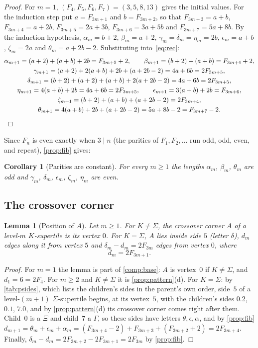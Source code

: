 \documentclass[11pt]{amsart}
\newtheorem{lemma}[theorem]{Lemma}
\newtheorem{corollary}[theorem]{Corollary}
\theoremstyle{definition}
\theoremstyle{remark}
\newcommand{\Fib}{F}
\begin{document}
\begin{proof}
For $m=1$, $(\Fib_4,\Fib_5,\Fib_6,\Fib_7)=(3,5,8,13)$ gives the initial values. For the induction step put
$a=\Fib_{3m+1}$ and $b=\Fib_{3m+2}$, so that $\Fib_{3m+3}=a+b$, $\Fib_{3m+4}=a+2b$, $\Fib_{3m+5}=2a+3b$,
$\Fib_{3m+6}=3a+5b$ and $\Fib_{3m+7}=5a+8b$. By the induction hypothesis, $\alpha_m=b+2$, $\beta_m=a+2$,
$\gamma_m=\delta_m=\eta_m=2b$, $\epsilon_m=a+b$, $\zeta_m=2a$ and $\theta_m=a+2b-2$. Substituting into~\eqref{eq:rec}:
\begin{gather*}
\alpha_{m+1}=(a+2)+(a+b)+2b=\Fib_{3m+5}+2,\qquad \beta_{m+1}=(b+2)+(a+b)=\Fib_{3m+4}+2,\\
\gamma_{m+1}=(a+2)+2(a+b)+2b+(a+2b-2)=4a+6b=2\Fib_{3m+5},\\
\delta_{m+1}=(b+2)+(a+2)+(a+b)+2(a+2b-2)=4a+6b=2\Fib_{3m+5},\\ \eta_{m+1}=4(a+b)+2b=4a+6b=2\Fib_{3m+5},\qquad
\epsilon_{m+1}=3(a+b)+2b=\Fib_{3m+6},\\ \zeta_{m+1}=(b+2)+(a+b)+(a+2b-2)=2\Fib_{3m+4},\\
\theta_{m+1}=4(a+b)+2b+(a+2b-2)=5a+8b-2=\Fib_{3m+7}-2.\qedhere
\end{gather*}
\end{proof}

Since $\Fib_n$ is even exactly when $3\mid n$ (the parities of $\Fib_1,\Fib_2,\dots$ run odd, odd, even, and
repeat), \cref{prop:fib} gives:

\begin{corollary}[Parities are constant]\label{cor:parity}
For every $m\ge1$ the lengths $\alpha_m$, $\beta_m$, $\theta_m$ are odd and $\gamma_m$, $\delta_m$, $\epsilon_m$,
$\zeta_m$, $\eta_m$ are even.
\end{corollary}

\subsection{The crossover corner}
\begin{lemma}[Position of $A$]\label{lem:Apos}
Let $m\ge1$. For $K\neq\Sigma$, the crossover corner $A$ of a level-$m$ $K$-supertile is its vertex $0$. For
$K=\Sigma$, $A$ lies inside side $5$ (letter $\delta$), $d_m$ edges along it from vertex $5$ and
$\delta_m-d_m=2\Fib_{3m}$ edges from vertex $0$, where
\[
d_m=2\Fib_{3m+1}.
\]
\end{lemma}

\begin{proof}
For $m=1$ the lemma is part of \cref{comp:base}: $A$ is vertex~$0$ if $K\neq\Sigma$, and $d_1=6=2\Fib_4$. For
$m\ge2$ and $K\neq\Sigma$ it is \cref{prop:pattern}(d). For $K=\Sigma$: by \cref{tab:psides}, which lists the
children's sides in the parent's own order, side~$5$ of a level-$(m+1)$ $\Sigma$-supertile begins, at its vertex~$5$,
with the children's sides $0.2$, $0.1$, $7.0$, and by \cref{prop:pattern}(d) its crossover corner comes right after
them.
Child~$0$ is a $\Xi$ and child~$7$ a $\Gamma$, so these sides have letters $\theta,\epsilon,\alpha$, and by
\cref{prop:fib}
$d_{m+1}=\theta_m+\epsilon_m+\alpha_m=(\Fib_{3m+4}-2)+\Fib_{3m+3}+(\Fib_{3m+2}+2)=2\Fib_{3m+4}$. Finally,
$\delta_m-d_m=2\Fib_{3m+2}-2\Fib_{3m+1}=2\Fib_{3m}$ by \cref{prop:fib}.
\end{proof}
\end{document}

